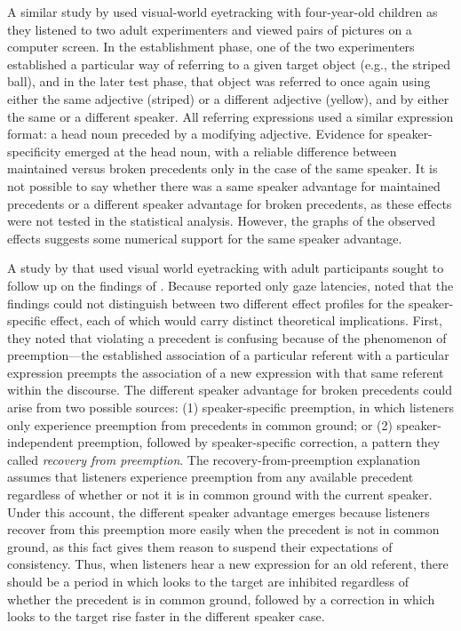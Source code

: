 \documentclass[doc,fignum,apacite,floatsintext]{apa6}
\begin{document}
A similar study by  used visual-world eyetracking with four-year-old children as they listened to two adult experimenters and viewed pairs of pictures on a computer screen.  In the establishment phase, one of the two experimenters established a particular way of referring to a given target object (e.g., the striped ball), and in the later test phase, that object was referred to once again using either the same adjective (striped) or a different adjective (yellow), and by either the same or a different speaker.  All referring expressions used a similar expression format: a head noun preceded by a modifying adjective.  Evidence for speaker-specificity emerged at the head noun, with a reliable difference between maintained versus broken precedents only in the case of the same speaker.  It is not possible to say whether there was a same speaker advantage for maintained precedents or a different speaker advantage for broken precedents, as these effects were not tested in the statistical analysis.  However, the graphs of the observed effects suggests some numerical support for the same speaker advantage.

A study by  that used visual world eyetracking with adult participants sought to follow up on the findings of .  Because  reported only gaze latencies,  noted that the findings could not distinguish between two different effect profiles for the speaker-specific effect, each of which would carry distinct theoretical implications.  First, they noted that violating a precedent is confusing because of the phenomenon of preemption---the established association of a particular referent with a particular expression preempts the association of a new expression with that same referent within the discourse.  The different speaker advantage for broken precedents could arise from two possible sources: (1) speaker-specific preemption, in which listeners only experience preemption from precedents in common ground; or (2) speaker-independent preemption, followed by speaker-specific correction, a pattern they called \textit{recovery from preemption}.  The recovery-from-preemption explanation assumes that listeners experience preemption from any available precedent regardless of whether or not it is in common ground with the current speaker.  Under this account, the different speaker advantage emerges because listeners recover from this preemption more easily when the precedent is not in common ground, as this fact gives them reason to suspend their expectations of consistency.  Thus, when listeners hear a new expression for an old referent, there should be a period in which looks to the target are inhibited regardless of whether the precedent is in common ground, followed by a correction in which looks to the target rise faster in the different speaker case.
\end{document}

